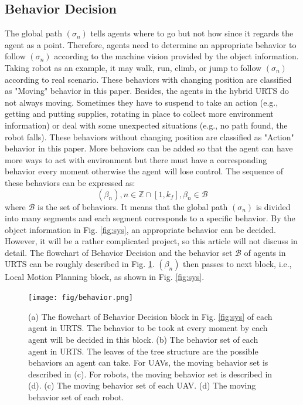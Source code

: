 \documentclass[journal,12pt,onecolumn,draftclsnofoot,]{IEEEtran}
\begin{document}
\subsection{Behavior Decision}
The global path $(\sigma_n)$ tells agents where to go but not how since it regards the agent as a point. Therefore, agents need to determine an appropriate behavior to follow $(\sigma_n)$ according to the machine vision provided by the object information. Taking robot as an example, it may walk, run, climb, or jump to follow $(\sigma_n)$ according to real scenario. These behaviors with changing position are classified as "Moving" behavior in this paper. Besides, the agents in the hybrid URTS do not always moving. Sometimes they have to suspend to take an action (e.g., getting and putting supplies, rotating in place to collect more environment information) or deal with some unexpected situations (e.g., no path found, the robot falls). These behaviors without changing position are classified as "Action" behavior in this paper. More behaviors can be added so that the agent can have more ways to act with environment but there must have a corresponding behavior every moment otherwise the agent will lose control. The sequence of these behaviors can be expressed as:
\begin{equation}
    (\beta_n), n\in\mathbb{Z}\cap[1,k_f], \beta_n\in\mathcal{B}
\end{equation}
where $\mathcal{B}$ is the set of behaviors. It means that the global path $(\sigma_n)$ is divided into many segments and each segment corresponds to a specific behavior. By the object information in Fig. \ref{fig:sys}, an appropriate behavior can be decided. However, it will be a rather complicated project, so this article will not discuss in detail. The flowchart of Behavior Decision and the behavior set $\mathcal{B}$ of agents in URTS can be roughly described in Fig. \ref{fig:behavior}. $(\beta_n)$ then passes to next block, i.e., Local Motion Planning block, as shown in Fig. \ref{fig:sys}.

\begin{figure}[htbp]
    \centering
    \texttt{[image: fig/behavior.png]}\caption{
        (a) The flowchart of Behavior Decision block in Fig. \ref{fig:sys} of each agent in URTS. The behavior to be took at every moment by each agent will be decided in this block. %
        (b) The behavior set of each agent in URTS. The leaves of the tree structure are the possible behaviors an agent can take. For UAVs, the moving behavior set is described in (c). For robots, the moving behavior set is described in (d). 
        (c) The moving behavior set of each UAV. 
        (d) The moving behavior set of each robot.}%
    \label{fig:behavior}
\end{figure}
\end{document}

